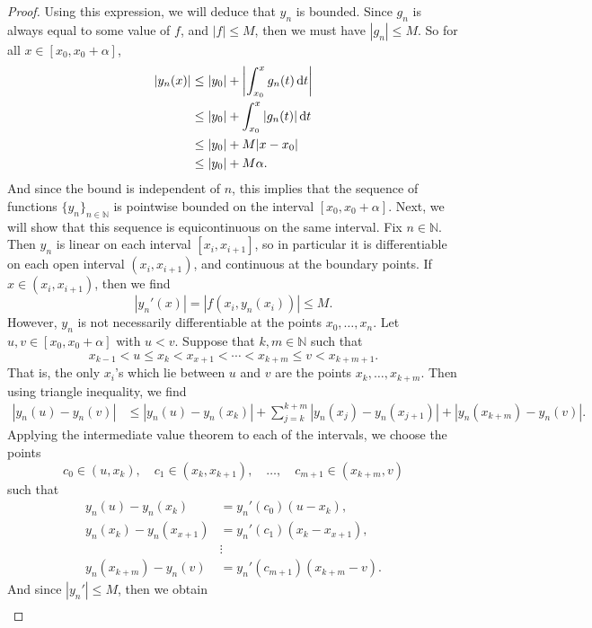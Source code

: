 \documentclass[12pt]{article}
\theoremstyle{definition}
\newcommand{\N}{\mathbb{N}}
\begin{document}
\begin{proof}
    Using this expression, we will deduce that $y_n$ is bounded. Since $g_n$ is always equal to some value of $f$, and $|f| \leq M$, then we must have $|g_n| \leq M$. So for all $x \in [x_0, x_0 + \alpha]$,
    \begin{align*}
        |y_n(x)|
            &\leq |y_0| + \abs{\int_{x_0}^{x} g_n(t) \dd{t}} \\
            &\leq |y_0| + \int_{x_0}^{x} |g_n(t)| \dd{t} \\
            &\leq |y_0| + M|x - x_0| \\
            &\leq |y_0| + M\alpha.
    \end{align*}
    And since the bound is independent of $n$, this implies that the sequence of functions $\{y_n\}_{n \in \N}$ is pointwise bounded on the interval $[x_0, x_0 + \alpha]$. Next, we will show that this sequence is equicontinuous on the same interval. Fix $n \in \N$. Then $y_n$ is linear on each interval $[x_i, x_{i+1}]$, so in particular it is differentiable on each open interval $(x_i, x_{i+1})$, and continuous at the boundary points. If $x \in (x_i, x_{i+1})$, then we find
    \[
        |y_n'(x)|
            = |f(x_i, y_n(x_i))|
            \leq M.
    \]
    However, $y_n$ is not necessarily differentiable at the points $x_0, \dots, x_n$. Let $u, v \in [x_0, x_0 + \alpha]$ with $u < v$. Suppose that $k, m \in \N$ such that
    \[
        x_{k-1} < u \leq x_k < x_{x+1} < \cdots < x_{k+m} \leq v < x_{k+m+1}.
    \]
    That is, the only $x_i$'s which lie between $u$ and $v$ are the points $x_k, \dots, x_{k+m}$. Then using triangle inequality, we find
    \begin{align*}
        |y_n(u) - y_n(v)| &\leq |y_n(u) - y_n(x_k)| + \sum_{j=k}^{k+m} |y_n(x_{j}) - y_n(x_{j+1})| + |y_n(x_{k+m}) - y_n(v)|.
    \end{align*}
    Applying the intermediate value theorem to each of the intervals, we choose the points
    \[
        c_0 \in (u, x_k), \quad c_1 \in (x_k, x_{k+1}), \quad \dots, \quad c_{m+1} \in (x_{k+m}, v)
    \]
    such that
    \begin{align*}
        y_n(u) - y_n(x_k) &= y_n'(c_0)(u - x_k), \\
        y_n(x_k) - y_n(x_{x+1}) &= y_n'(c_1)(x_k - x_{x+1}), \\
            & \vdots \\
        y_n(x_{k+m}) - y_n(v) &= y_n'(c_{m+1})(x_{k+m} - v).
    \end{align*}
    And since $|y_n'| \leq M$, then we obtain
    \begin{align*}

\end{align*}
\end{proof}
\end{document}
